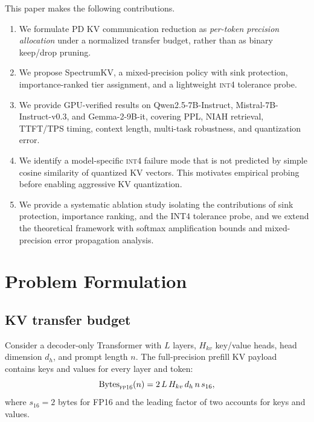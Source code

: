 \documentclass[11pt]{article}
\newcommand{\method}{SpectrumKV}
\newcommand{\niah}{NIAH}
\newcommand{\fp}{\textsc{fp16}}
\newcommand{\intiv}{\textsc{int4}}
\theoremstyle{plain}
\theoremstyle{definition}
\begin{document}
This paper makes the following contributions.
\begin{enumerate}[leftmargin=1.6em,itemsep=2pt]
    \item We formulate PD KV communication reduction as \emph{per-token precision allocation} under a normalized transfer budget, rather than as binary keep/drop pruning.
    \item We propose \method{}, a mixed-precision policy with sink protection, importance-ranked tier assignment, and a lightweight \intiv{} tolerance probe.
    \item We provide GPU-verified results on Qwen2.5-7B-Instruct, Mistral-7B-Instruct-v0.3, and Gemma-2-9B-it, covering PPL, \niah{} retrieval, TTFT/TPS timing, context length, multi-task robustness, and quantization error.
    \item We identify a model-specific \intiv{} failure mode that is not predicted by simple cosine similarity of quantized KV vectors.  This motivates empirical probing before enabling aggressive KV quantization.
    \item We provide a systematic ablation study isolating the contributions of sink protection, importance ranking, and the INT4 tolerance probe, and we extend the theoretical framework with softmax amplification bounds and mixed-precision error propagation analysis.
\end{enumerate}

\section{Problem Formulation}
\label{sec:formulation}

\subsection{KV transfer budget}
Consider a decoder-only Transformer with $L$ layers, $H_{kv}$ key/value heads, head dimension $d_h$, and prompt length $n$.  The full-precision prefill KV payload contains keys and values for every layer and token:
\begin{equation}
  \mathrm{Bytes}_{\fp{}}(n)= 2\,L\,H_{kv}\,d_h\,n\,s_{16},
  \label{eq:fullbytes}
\end{equation}
where $s_{16}=2$ bytes for FP16 and the leading factor of two accounts for keys and values.
\end{document}
